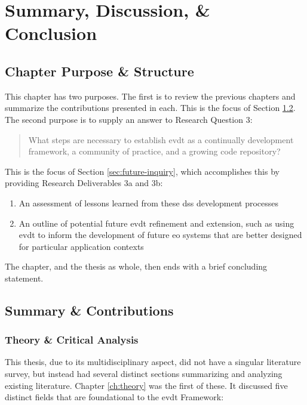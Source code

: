 \chapter{Summary, Discussion, \& Conclusion} \label{ch:conclusion}

\section{Chapter Purpose \& Structure}

This chapter has two purposes. The first is to review the previous chapters and summarize the contributions presented in each. This is the focus of Section \ref{sec:summary}. The second purpose is to supply an answer to Research Question 3:

\blockquote{What steps are necessary to establish \acf{evdt} as a continually development framework, a community of practice, and a growing code repository?}

This is the focus of Section \ref{sec:future-inquiry}, which accomplishes this by providing Research Deliverables 3a and 3b:
	\begin{enumerate}[label=\emph{\alph*},itemsep=0pt,parsep=0pt]
		\item{An assessment of lessons learned from these \acf{dss} development processes} 
		\item{An outline of potential future \ac{evdt} refinement and extension, such as using \ac{evdt} to inform the development of future \acf{eo} systems that are better designed for particular application contexts}
	\end{enumerate}
	
The chapter, and the thesis as whole, then ends with a brief concluding statement.

\section{Summary \& Contributions} \label{sec:summary}

\subsection{Theory \& Critical Analysis}

This thesis, due to its multidisciplinary aspect, did not have a singular literature survey, but instead had several distinct sections summarizing and analyzing existing literature. Chapter \ref{ch:theory} was the first of these. It discussed five distinct fields that are foundational to the \ac{evdt} Framework:

